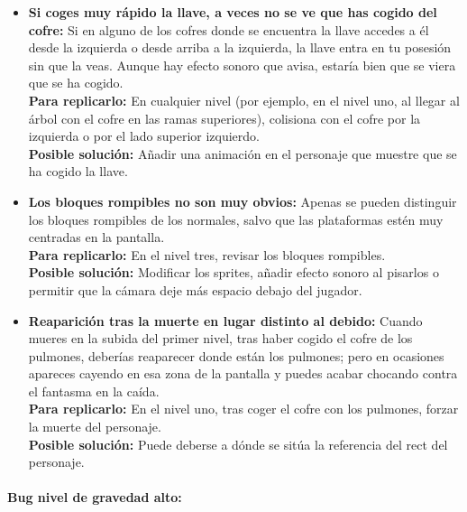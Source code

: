 \documentclass[12pt,a4paper,twoside,spanish]{article}      %
\begin{document}
\begin{itemize}
    \item \textbf{Si coges muy rápido la llave, a veces no se ve que has cogido del cofre:} Si en alguno de los cofres donde se encuentra la llave accedes a él desde la izquierda o desde arriba a la izquierda, la llave entra en tu posesión sin que la veas. Aunque hay efecto sonoro que avisa, estaría bien que se viera que se ha cogido.\\[1mm]
    \textbf{Para replicarlo:} En cualquier nivel (por ejemplo, en el nivel uno, al llegar al árbol con el cofre en las ramas superiores), colisiona con el cofre por la izquierda o por el lado superior izquierdo.\\[1mm]
    \textbf{Posible solución:} Añadir una animación en el personaje que muestre que se ha cogido la llave.
    
    \item \textbf{Los bloques rompibles no son muy obvios:} Apenas se pueden distinguir los bloques rompibles de los normales, salvo que las plataformas estén muy centradas en la pantalla.\\[1mm]
    \textbf{Para replicarlo:} En el nivel tres, revisar los bloques rompibles.\\[1mm]
    \textbf{Posible solución:} Modificar los sprites, añadir efecto sonoro al pisarlos o permitir que la cámara deje más espacio debajo del jugador.
    
    \item \textbf{Reaparición tras la muerte en lugar distinto al debido:} Cuando mueres en la subida del primer nivel, tras haber cogido el cofre de los pulmones, deberías reaparecer donde están los pulmones; pero en ocasiones apareces cayendo en esa zona de la pantalla y puedes acabar chocando contra el fantasma en la caída.\\[1mm]
    \textbf{Para replicarlo:} En el nivel uno, tras coger el cofre con los pulmones, forzar la muerte del personaje.\\[1mm]
    \textbf{Posible solución:} Puede deberse a dónde se sitúa la referencia del rect del personaje.
\end{itemize}

\bigskip

\paragraph*{Bug nivel de gravedad alto:}
\end{document}
